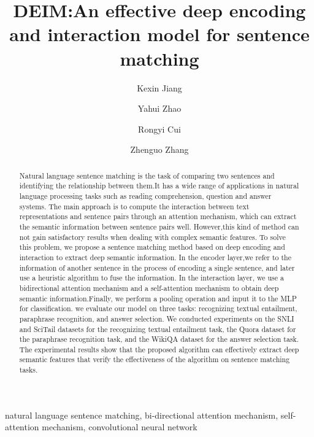 \documentclass[review]{elsarticle}
\begin{document}
\begin{frontmatter}

\title{DEIM:An effective deep encoding and interaction model for sentence matching }



\author[mymainaddress]{Kexin Jiang}


\author[mymainaddress]{Yahui Zhao}

\author[mymainaddress]{Rongyi Cui}

\author[mymainaddress]{Zhenguo Zhang}



\address[mymainaddress]{Department of Computer Science and Technology, Yanbian University.\\
977 Gongyuan Road, Yanji, P.R.China 133002.}


\begin{abstract}
Natural language sentence matching is the task of comparing two sentences and identifying the relationship between them.It has a wide range of applications in natural language processing tasks such as reading comprehension, question and answer systems. The main approach is to compute the interaction between text representations and sentence pairs through an attention mechanism, which can extract the semantic information between sentence pairs well. However,this kind of method can not gain satisfactory  results when dealing with complex semantic features. To solve this problem, 
we propose a sentence matching method based on deep encoding and interaction to extract deep semantic information. In the encoder layer,we refer to the information of another sentence in the process of encoding a single sentence, and later use a heuristic  algorithm to fuse the information. In the interaction layer, we use a bidirectional attention mechanism and a self-attention mechanism to obtain deep semantic information.Finally, we perform a pooling operation and input it to the MLP for classification. we evaluate our model on three tasks: recognizing textual entailment, paraphrase recognition, and answer selection. We conducted experiments on the SNLI and SciTail datasets for the recognizing textual entailment task, the Quora dataset for the paraphrase recognition task, and the WikiQA dataset for the answer selection task. The experimental results show that the proposed algorithm can effectively extract deep semantic features that verify the effectiveness of the algorithm on sentence matching tasks.
\end{abstract}

\begin{keyword}
natural language sentence matching,  bi-directional attention mechanism, self-attention mechanism, convolutional neural network
\end{keyword}
\end{frontmatter}
\end{document}
